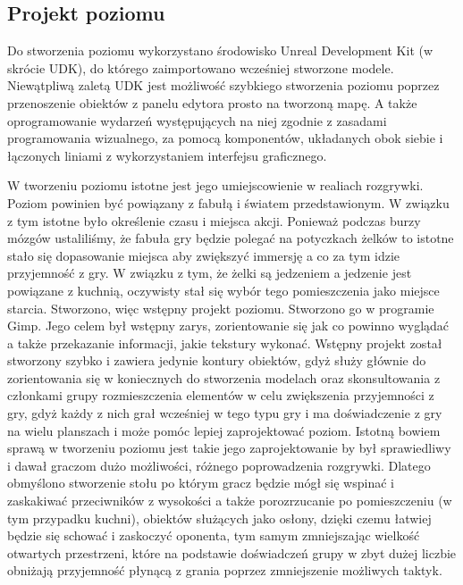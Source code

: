 \subsection{Projekt poziomu}
Do stworzenia poziomu wykorzystano środowisko Unreal Development Kit (w skrócie UDK), do którego zaimportowano wcześniej stworzone modele. Niewątpliwą zaletą UDK jest możliwość szybkiego stworzenia poziomu poprzez przenoszenie obiektów z panelu edytora prosto na tworzoną mapę. A także oprogramowanie wydarzeń występujących na niej zgodnie z zasadami programowania wizualnego, za pomocą komponentów, układanych obok siebie i łączonych liniami z wykorzystaniem interfejsu graficznego.

W tworzeniu poziomu istotne jest jego umiejscowienie w realiach rozgrywki. Poziom powinien być powiązany z fabułą i światem przedstawionym. W związku z tym istotne było określenie czasu i miejsca akcji. Ponieważ podczas burzy mózgów ustaliliśmy, że fabuła gry będzie polegać na potyczkach żelków to istotne stało się dopasowanie miejsca aby zwiększyć immersję a co za tym idzie przyjemność z gry. W związku z tym, że żelki są jedzeniem a jedzenie jest powiązane z kuchnią, oczywisty stał się wybór tego pomieszczenia jako miejsce starcia. Stworzono, więc wstępny projekt poziomu. Stworzono go w programie Gimp. Jego celem był wstępny zarys, zorientowanie się jak co powinno wyglądać a także przekazanie informacji, jakie tekstury wykonać. Wstępny projekt został stworzony szybko i zawiera jedynie kontury obiektów, gdyż służy głównie do zorientowania się w koniecznych do stworzenia modelach oraz skonsultowania z członkami grupy rozmieszczenia elementów w celu zwiększenia przyjemności z gry, gdyż każdy z nich grał wcześniej w tego typu gry i ma doświadczenie z gry na wielu planszach i może pomóc lepiej zaprojektować poziom. Istotną bowiem sprawą w tworzeniu poziomu jest takie jego zaprojektowanie by był sprawiedliwy i dawał graczom dużo możliwości, różnego poprowadzenia rozgrywki. Dlatego obmyślono stworzenie stołu po którym gracz będzie mógł się wspinać i zaskakiwać przeciwników z wysokości a także porozrzucanie po pomieszczeniu (w tym przypadku kuchni), obiektów służących jako osłony, dzięki czemu łatwiej będzie się schować i zaskoczyć oponenta, tym samym zmniejszając wielkość otwartych przestrzeni, które na podstawie doświadczeń grupy w zbyt dużej liczbie obniżają przyjemność płynącą z grania poprzez zmniejszenie możliwych taktyk.


